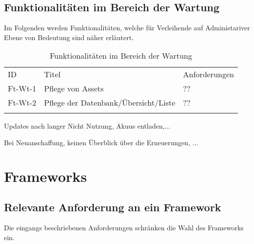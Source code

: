 \subsection{Funktionalitäten im Bereich der Wartung}
\label{subsec:ft-wartung}
Im Folgenden werden Funktionalitäten, welche für Verleihende auf Administariver Ebene von Bedeutung sind
näher erläutert. 
\begin{table}[h]
    \centering
    \caption{Funktionalitäten im Bereich der Wartung}
    \begin{tabular}{lll}
            \arrayrulecolor{maincolor}\hline
            \sffamily\color{maincolor}ID & \sffamily\color{maincolor}Titel &
            \sffamily\color{maincolor}Anforderungen \\
            \arrayrulecolor{maincolor}\hline
            Ft-Wt-1 & Pflege von Assets                  & ?? \\
            Ft-Wt-2 & Pflege der Datenbank/Übersicht/Liste            & ?? \\
            \arrayrulecolor{maincolor}\hline
    \end{tabular}
    \label{table:Ft-Wt}
\end{table}

Updates nach langer Nicht Nutzung, Akuus entladen,...

Bei Neuanschaffung, keinen Überblick über die Erneuerungen, ...


\section{Frameworks} 

\subsection{Relevante Anforderung an ein Framework}
Die eingangs beschriebenen Anforderungen schränken die Wahl des Frameworks ein.


